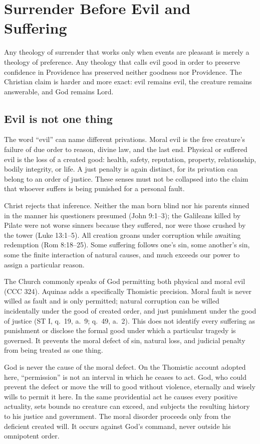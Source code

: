 \section{Surrender Before Evil and Suffering}

Any theology of surrender that works only when events are pleasant is merely a
theology of preference. Any theology that calls evil good in order to preserve
confidence in Providence has preserved neither goodness nor Providence. The
Christian claim is harder and more exact: evil remains evil, the creature
remains answerable, and God remains Lord.

\subsection{Evil is not one thing}

The word ``evil'' can name different privations. Moral evil is the free creature's failure of due order to reason, divine law, and the last end. Physical or suffered evil is the loss of a created good: health, safety, reputation, property, relationship, bodily integrity, or life. A just penalty is again distinct, for its privation can belong to an order of justice. These senses must not be collapsed into the claim that whoever suffers is being punished for a personal fault.

Christ rejects that inference. Neither the man born blind nor his parents sinned in the manner his questioners presumed (John 9:1--3); the Galileans killed by Pilate were not worse sinners because they suffered, nor were those crushed by the tower (Luke 13:1--5). All creation groans under corruption while awaiting redemption (Rom 8:18--25). Some suffering follows one's sin, some another's sin, some the finite interaction of natural causes, and much exceeds our power to assign a particular reason.

The Church commonly speaks of God permitting both physical and moral evil (CCC 324). Aquinas adds a specifically Thomistic precision. Moral fault is never willed as fault and is only permitted; natural corruption can be willed incidentally under the good of created order, and just punishment under the good of justice (ST I, q.~19, a.~9; q.~49, a.~2). This does not identify every suffering as punishment or disclose the formal good under which a particular tragedy is governed. It prevents the moral defect of sin, natural loss, and judicial penalty from being treated as one thing.

God is never the cause of the moral defect. On the Thomistic account adopted here, ``permission'' is not an interval in which he ceases to act. God, who could prevent the defect or move the will to good without violence, eternally and wisely wills to permit it here. In the same providential act he causes every positive actuality, sets bounds no creature can exceed, and subjects the resulting history to his justice and government. The moral disorder proceeds only from the deficient created will. It occurs against God's command, never outside his omnipotent order.

